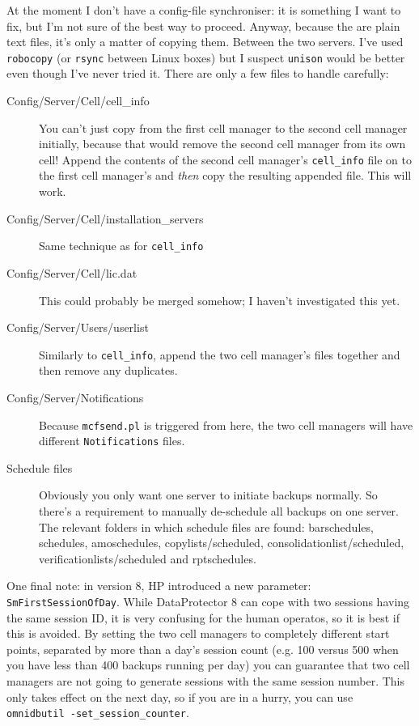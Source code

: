 \documentclass{article}
\begin{document}
At the moment I don't have a config-file synchroniser: it is something I want to fix, but I'm not sure of the best way to proceed. Anyway, because the are plain text files, it's only a matter
of copying them. Between the two servers. I've used {\tt robocopy} (or {\tt rsync} between Linux boxes) but I suspect {\tt unison} would be better even though I've never tried it. There are only a few files to handle carefully:
\begin{description}
\item[Config/Server/Cell/cell\_info] You can't just copy from the first cell manager to the second cell manager initially, because that would remove the second cell manager from its own cell! Append the contents of the second cell manager's {\tt cell\_info} file on to the first cell manager's and {\it then} copy the resulting appended file. This will work.
\item[Config/Server/Cell/installation\_servers] Same technique as for {\tt cell\_info}
\item[Config/Server/Cell/lic.dat] This could probably be merged somehow; I haven't investigated this yet.
\item[Config/Server/Users/userlist] Similarly to {\tt cell\_info}, append the two cell manager's files together and then remove any duplicates.
\item[Config/Server/Notifications] Because {\tt mcfsend.pl} is triggered from here, the two cell managers will have different {\tt Notifications} files.
\item[Schedule files] Obviously you only want one server to initiate backups normally. So there's a requirement to manually de-schedule all backups on one server. The
relevant folders in which schedule files are found: barschedules, schedules, amoschedules, copylists/scheduled, consolidationlist/scheduled, verificationlists/scheduled and rptschedules. 
\end{description}

One final note: in version 8, HP introduced a new parameter: {\tt SmFirstSessionOfDay}. While DataProtector 8 can cope with two sessions having the same session ID, it is very
confusing for the human operatos, so it is best if this is avoided. By setting the two cell managers to completely different start points, separated by more than a day's session count (e.g. 100 versus 500 when you have less than 400 backups running per day) you can guarantee that two cell managers are not going to generate sessions with the same session number. This only takes effect on the next day, so if you are in a hurry, you can use {\tt omnidbutil -set\_session\_counter}. 
\end{document}

